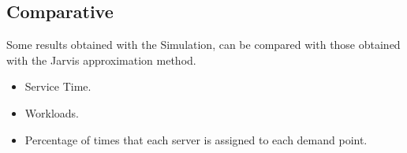 \subsection{Comparative}
\begin{frame}
  Some results obtained with the Simulation,
  can be compared with those obtained with the Jarvis approximation method. 
  \begin{itemize}
  \item Service Time.
  \item Workloads.
  \item Percentage of times that each server is assigned to each demand point.
  \end{itemize}
\end{frame}
